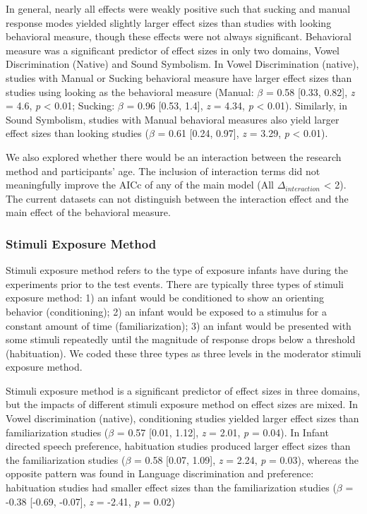 \documentclass[10pt, letterpaper]{article}
\begin{document}
In general, nearly all effects were weakly positive such that sucking
and manual response modes yielded slightly larger effect sizes than
studies with looking behavioral measure, though these effects were not
always significant. Behavioral measure was a significant predictor of
effect sizes in only two domains, Vowel Discrimination (Native) and
Sound Symbolism. In Vowel Discrimination (native), studies with Manual
or Sucking behavioral measure have larger effect sizes than studies
using looking as the behavioral measure (Manual: \(\beta\) = 0.58
{[}0.33, 0.82{]}, \emph{z} = 4.6, \emph{p} \textless{} 0.01; Sucking:
\(\beta\) = 0.96 {[}0.53, 1.4{]}, \emph{z} = 4.34, \emph{p} \textless{}
0.01). Similarly, in Sound Symbolism, studies with Manual behavioral
measures also yield larger effect sizes than looking studies (\(\beta\)
= 0.61 {[}0.24, 0.97{]}, \emph{z} = 3.29, \emph{p} \textless{} 0.01).

We also explored whether there would be an interaction between the
research method and participants' age. The inclusion of interaction
terms did not meaningfully improve the AICc of any of the main model
(All \(\Delta_{interaction}\) \textless{} 2). The current datasets can
not distinguish between the interaction effect and the main effect of
the behavioral measure.

\hypertarget{stimuli-exposure-method}{%
\subsubsection{Stimuli Exposure Method}\label{stimuli-exposure-method}}

Stimuli exposure method refers to the type of exposure infants have
during the experiments prior to the test events. There are typically
three types of stimuli exposure method: 1) an infant would be
conditioned to show an orienting behavior (conditioning); 2) an infant
would be exposed to a stimulus for a constant amount of time
(familiarization); 3) an infant would be presented with some stimuli
repeatedly until the magnitude of response drops below a threshold
(habituation). We coded these three types as three levels in the
moderator stimuli exposure method.

Stimuli exposure method is a significant predictor of effect sizes in
three domains, but the impacts of different stimuli exposure method on
effect sizes are mixed. In Vowel discrimination (native), conditioning
studies yielded larger effect sizes than familiarization studies
(\(\beta\) = 0.57 {[}0.01, 1.12{]}, \emph{z} = 2.01, \emph{p} = 0.04).
In Infant directed speech preference, habituation studies produced
larger effect sizes than the familiarization studies (\(\beta\) = 0.58
{[}0.07, 1.09{]}, \emph{z} = 2.24, \emph{p} = 0.03), whereas the
opposite pattern was found in Language discrimination and preference:
habituation studies had smaller effect sizes than the familiarization
studies (\(\beta\) = -0.38 {[}-0.69, -0.07{]}, \emph{z} = -2.41,
\emph{p} = 0.02)
\end{document}
